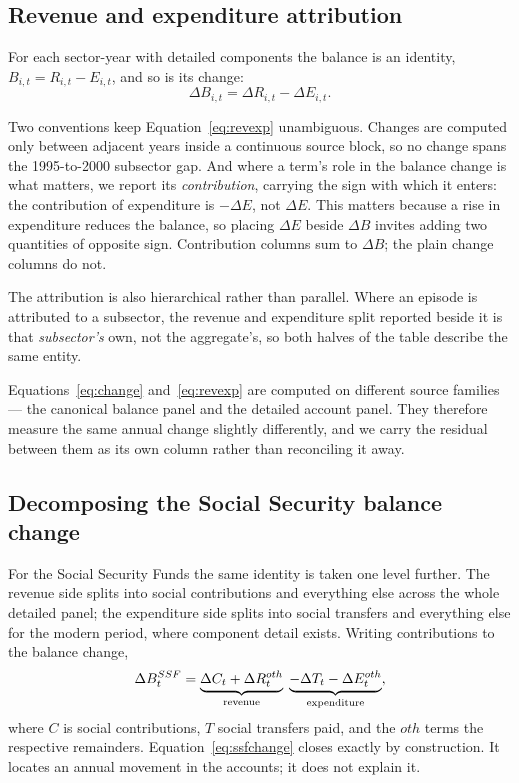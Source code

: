 \subsection{Revenue and expenditure attribution}

For each sector-year with detailed components the balance is an identity,
$B_{i,t} = R_{i,t} - E_{i,t}$, and so is its change:
\begin{equation}
\Delta B_{i,t} = \Delta R_{i,t} - \Delta E_{i,t}.
\label{eq:revexp}
\end{equation}

Two conventions keep Equation~\eqref{eq:revexp} unambiguous. Changes are computed
only between adjacent years inside a continuous source block, so no change spans the
1995-to-2000 subsector gap. And where a term's role in the balance change is what
matters, we report its \emph{contribution}, carrying the sign with which it enters:
the contribution of expenditure is $-\Delta E$, not $\Delta E$. This matters because
a rise in expenditure reduces the balance, so placing $\Delta E$ beside $\Delta B$
invites adding two quantities of opposite sign. Contribution columns sum to $\Delta B$;
the plain change columns do not.

The attribution is also hierarchical rather than parallel. Where an episode is
attributed to a subsector, the revenue and expenditure split reported beside it is
that \emph{subsector's} own, not the aggregate's, so both halves of the table describe
the same entity.

Equations~\eqref{eq:change} and~\eqref{eq:revexp} are computed on different source
families --- the canonical balance panel and the detailed account panel. They
therefore measure the same annual change slightly differently, and we carry the
residual between them as its own column rather than reconciling it away.

\subsection{Decomposing the Social Security balance change}

For the Social Security Funds the same identity is taken one level further. The
revenue side splits into social contributions and everything else across the whole
detailed panel; the expenditure side splits into social transfers and everything else
for the modern period, where component detail exists. Writing contributions to the
balance change,
\begin{equation}
\Delta B^{SSF}_t
= \underbrace{\Delta C_t + \Delta R^{oth}_t}_{\text{revenue}}
\; \underbrace{- \Delta T_t - \Delta E^{oth}_t}_{\text{expenditure}},
\label{eq:ssfchange}
\end{equation}
where $C$ is social contributions, $T$ social transfers paid, and the $oth$ terms the
respective remainders. Equation~\eqref{eq:ssfchange} closes exactly by construction.
It locates an annual movement in the accounts; it does not explain it.

